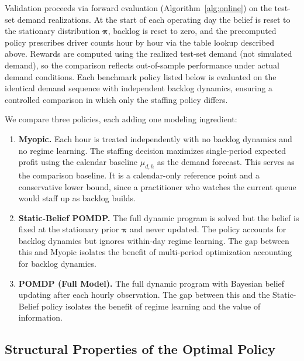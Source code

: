 \documentclass[preprint,11pt,authoryear]{elsarticle}
\newcommand{\bvec}[1]{\mathbf{#1}}
\theoremstyle{remark}
\begin{document}
Validation proceeds via forward evaluation (Algorithm~\ref{alg:online}) on the test-set demand realizations. At the start of each operating day the belief is reset to the stationary distribution $\bvec{\pi}$, backlog is reset to zero, and the precomputed policy prescribes driver counts hour by hour via the table lookup described above. Rewards are computed using the realized test-set demand (not simulated demand), so the comparison reflects out-of-sample performance under actual demand conditions. Each benchmark policy listed below is evaluated on the identical demand sequence with independent backlog dynamics, ensuring a controlled comparison in which only the staffing policy differs.

We compare three policies, each adding one modeling ingredient:

\begin{enumerate}

    \item \textbf{Myopic.} Each hour is treated independently with no backlog dynamics and no regime learning. The staffing decision maximizes single-period expected profit using the calendar baseline $\mu_{d,h}$ as the demand forecast. This serves as the comparison baseline. It is a calendar-only reference point and a conservative lower bound, since a practitioner who watches the current queue would staff up as backlog builds.

    \item \textbf{Static-Belief POMDP.} The full dynamic program is solved but the belief is fixed at the stationary prior $\bvec{\pi}$ and never updated. The policy accounts for backlog dynamics but ignores within-day regime learning. The gap between this and Myopic isolates the benefit of multi-period optimization accounting for backlog dynamics.

    \item \textbf{POMDP (Full Model).} The full dynamic program with Bayesian belief updating after each hourly observation. The gap between this and the Static-Belief policy isolates the benefit of regime learning and the value of information.

\end{enumerate}


\subsection{Structural Properties of the Optimal Policy}
\label{sec:structural_results}
\end{document}
